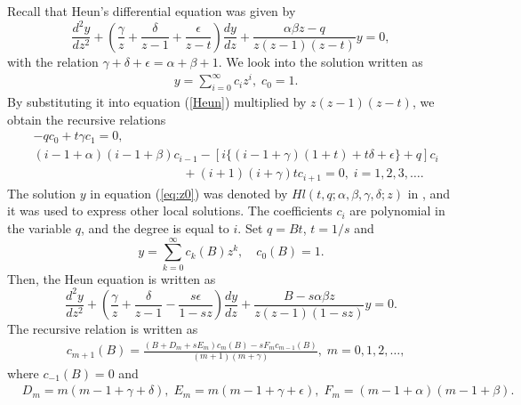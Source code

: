 \documentclass[12pt]{amsart}
\numberwithin{equation}{section}
\theoremstyle{definition}
\theoremstyle{remark}
\begin{document}
Recall that Heun's differential equation was given by
\begin{equation}
\frac{d^2y}{dz^2} + \left( \frac{\gamma}{z}+\frac{\delta }{z-1}+\frac{\epsilon}{z-t}\right) \frac{dy}{dz} +\frac{\alpha \beta z -q}{z(z-1)(z-t)} y=0,
\label{Heun}
\end{equation}
with the relation $\gamma +\delta +\epsilon =\alpha +\beta +1$.
We look into the solution written as 
\begin{align}
& y = \sum_{i=0}^{\infty } c_i z^i , \; c_0=1. 
\label{eq:z0}
\end{align}
By substituting it into equation (\ref{Heun}) multiplied by $z(z-1)(z-t)$, we obtain the recursive relations
\begin{align}
& -q c_0 +t\gamma c_1=0 , \label{eq:Hlci} \\
& (i-1+\alpha )(i-1+\beta )c_{i-1} -[i\{ (i-1+\gamma )(1+t) +t\delta +\epsilon \} +q]c_i \nonumber \\
& \qquad \qquad \qquad \qquad \qquad \qquad +(i+1)(i+\gamma )t c_{i+1}=0 , \; i=1,2,3, \dots . \nonumber
\end{align}
The solution $y$ in equation (\ref{eq:z0}) was denoted by $Hl(t,q;\alpha ,\beta ,\gamma ,\delta ;z)$ in \cite{Ron}, and it was used to express other local solutions.
The coefficients $c_i$ are polynomial in the variable $q$, and the degree is equal to $i$.
Set $q=Bt$, $t=1/s$ and 
\begin{equation}
 y = \sum _{k=0}^{\infty } c_k (B)  z^k , \quad c_0(B)=1 .
\label{eq:yckHeun}
\end{equation}
Then, the Heun equation is written as
\begin{equation}
\frac{d^2y}{dz^2} + \left( \frac{\gamma}{z}+\frac{\delta }{z-1} - \frac{s\epsilon}{1-sz}\right) \frac{dy}{dz} +\frac{B - s\alpha \beta z}{z(z-1)(1-sz)} y=0.
\label{HeunBs}
\end{equation}
The recursive relation is written as
\begin{align}
& c_{m+1} (B) = \frac{(B+D_m +s E_m) c_{m} (B) -s F_m c_{m-1} (B)}{(m+1)(m+\gamma )} , \; m=0,1,2, \dots ,
\end{align}
where $ c_{-1} (B)=0$ and
\begin{align}
& D_{m}= m(m-1+\gamma+\delta),\; E_{m}= m(m-1+\gamma+\epsilon), \; F_{m}= (m-1+\alpha)(m-1+\beta).
\end{align}
\end{document}
